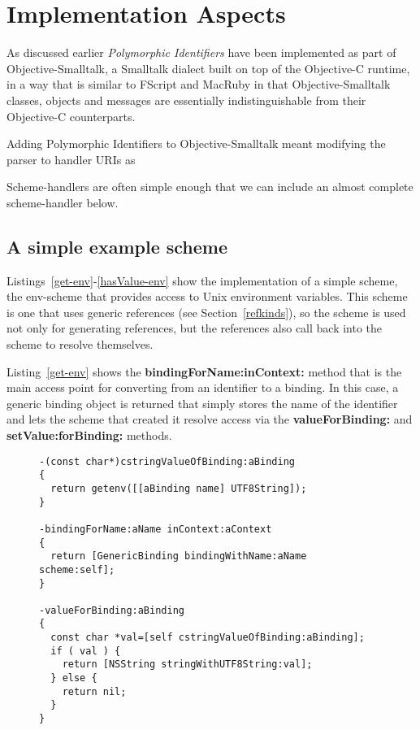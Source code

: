 \documentclass[preprint,authoryear]{llncs}
\begin{document}
\section{Implementation Aspects}
\label{implementation}

As discussed earlier \emph{Polymorphic Identifiers} have been implemented as part of Objective-Smalltalk,
a Smalltalk dialect built on top of the Objective-C\cite{objc-evol}\cite{objc-apple} runtime, 
in a way that is similar to FScript\cite{fscript} and MacRuby \cite{macruby} in that Objective-Smalltalk classes,
objects and messages are essentially indistinguishable from their Objective-C counterparts.

Adding Polymorphic Identifiers to Objective-Smalltalk meant modifying the parser to handler URIs as 

Scheme-handlers are often simple enough that we can include an almost complete scheme-handler below.

\subsection{A simple example scheme}

Listings~\ref{get-env}-\ref{hasValue-env} show the implementation of a simple scheme,
the env-scheme that provides access to Unix environment variables.  This scheme is
one that uses generic references (see Section~\ref{refkinds}), so the scheme is used
not only for generating references, but the references also call back into the scheme
to resolve themselves.

Listing~\ref{get-env} 
shows the {\bf bindingForName:inContext:} method that is the main access point for
converting from an identifier to a binding.  In this case, a generic binding object is returned
that simply stores the name of the identifier and lets the scheme that created it resolve
access via the {\bf valueForBinding:} and {\bf setValue:forBinding:} methods.


\begin{figure}[htbp]
\begin{lstlisting}[style=L,label=get-env,caption=Basic lookup in env: scheme.]
-(const char*)cstringValueOfBinding:aBinding
{
  return getenv([[aBinding name] UTF8String]);
}

-bindingForName:aName inContext:aContext
{
  return [GenericBinding bindingWithName:aName scheme:self];
}

-valueForBinding:aBinding
{
  const char *val=[self cstringValueOfBinding:aBinding];
  if ( val ) {
    return [NSString stringWithUTF8String:val];
  } else {
    return nil;
  }
}
\end{lstlisting}
\end{figure}
\end{document}

